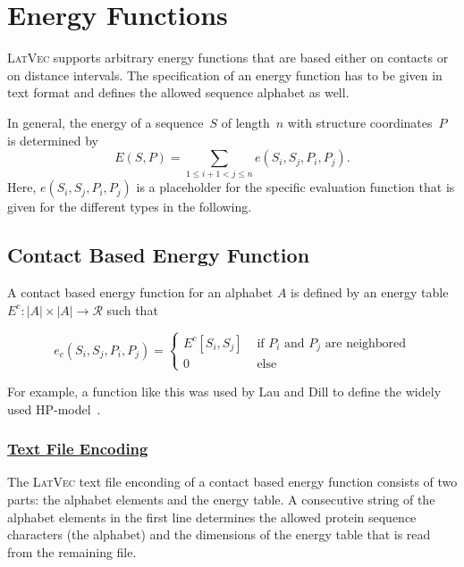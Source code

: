 \documentclass{article}
\newcommand{\latvec}{\textsc{LatVec}}
\begin{document}
\section{Energy Functions}
\label{sec:energy}

\latvec{} supports arbitrary energy functions that are based either on contacts
or on distance intervals. The specification of an energy function has to be
given in text format and defines the allowed sequence alphabet as well.

In general, the energy of a sequence~$S$ of length~$n$ with structure
coordinates~$P$ is determined by
\begin{equation}
	E(S,P) = \sum_{1\leq i+1<j\leq n} e(S_i, S_j, P_i, P_j).
\end{equation}
Here, $e(S_i, S_j, P_i, P_j)$ is a placeholder for the specific evaluation
function that is given for the different types in the following.

\subsection{Contact Based Energy Function}
\label{sec:energy:contact}

A contact based energy function for an alphabet $A$ is defined by an energy
table $E^c : |A|\times|A| \rightarrow \mathcal{R}$ such that 

\begin{equation}
	e_c(S_i, S_j, P_i, P_j) = 
	\left\{
	\begin{array}{ll}
    	E^c[S_i,S_j] & \mbox{ if $P_i$ and $P_j$ are neighbored} \\
    	0 & \mbox{ else }
    \end{array} \right.
\end{equation}

For example, a function like this was used by Lau and Dill to define the widely
used HP-model~\cite{Lau_Dill:89a}.

\subsubsection*{\underline{ Text File Encoding }}

The \latvec{} text file enconding of a contact based energy function consists of
two parts: the alphabet elements and the energy table. A consecutive string of
the alphabet elements in the first line determines the allowed protein sequence
characters (the alphabet) and the dimensions of the energy table that is read
from the remaining file.
\end{document}
